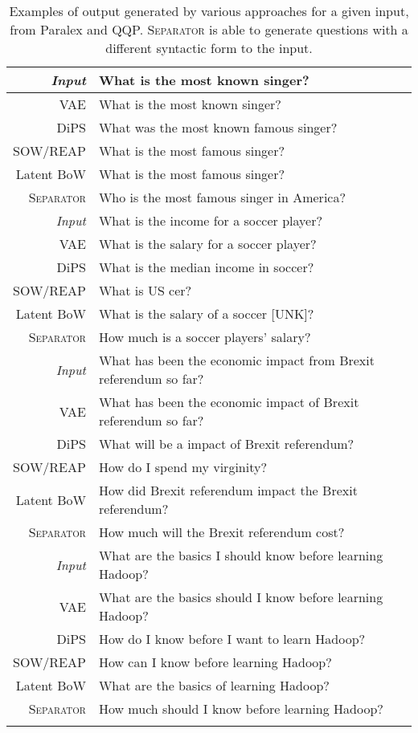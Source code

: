 \documentclass[11pt,a4paper]{article}
\begin{document}
\begin{table}[t]
    \small
    \centering
    \begin{tabular}{@{}r@{~}|@{~}p{6cm}@{}}
    \hhline{==} 
    \textit{Input} & What is the most known singer? \\
    \hline
    {VAE} & What is the most known singer? \\
    {DiPS} & What was the most known famous singer? \\
    {SOW/REAP} & What is the most famous singer? \\
    {Latent BoW} & What is the most famous singer? \\
    \textsc{Separator} & Who is the most famous singer in America? \\
    \hhline{==} 
    \textit{Input} & What is the income for a soccer player? \\
    \hline
    {VAE} &  What is the salary for a soccer player? \\
    {DiPS} &  What is the median income in soccer? \\
    {SOW/REAP} & What is US cer? \\
    {Latent BoW} &  What is the salary of a soccer [UNK]? \\
    \textsc{Separator} &  How much is a soccer players' salary? \\
    \hhline{==} 
    \textit{Input} & What has been the economic impact from Brexit referendum so far? \\
    \hline
    {VAE} &  What has been the economic impact of Brexit referendum so far? \\
    {DiPS} &  What will be a impact of Brexit referendum? \\
    {SOW/REAP} & How do I spend my virginity? \\
    {Latent BoW} &  How did Brexit referendum impact the Brexit referendum? \\
    \textsc{Separator} &  How much will the Brexit referendum cost? \\
    \hhline{==} 
    \textit{Input} & What are the basics I should know before learning Hadoop? \\
    \hline
    {VAE} &  What are the basics should I know before learning Hadoop? \\
    {DiPS} &  How do I know before I want to learn Hadoop? \\
    {SOW/REAP} & How can I know before learning Hadoop? \\
    {Latent BoW} &  What are the basics of learning Hadoop? \\
    \textsc{Separator} &  How much should I know before learning Hadoop? \\
    \hhline{==} 
\end{tabular}
\vspace*{-.1cm}
    \caption{Examples of output generated by various approaches for a
      given input, from Paralex and QQP. \textsc{Separator} is able to
      generate questions with a different syntactic form to the input.}
\label{tab:examples} 
\end{table}
\end{document}

